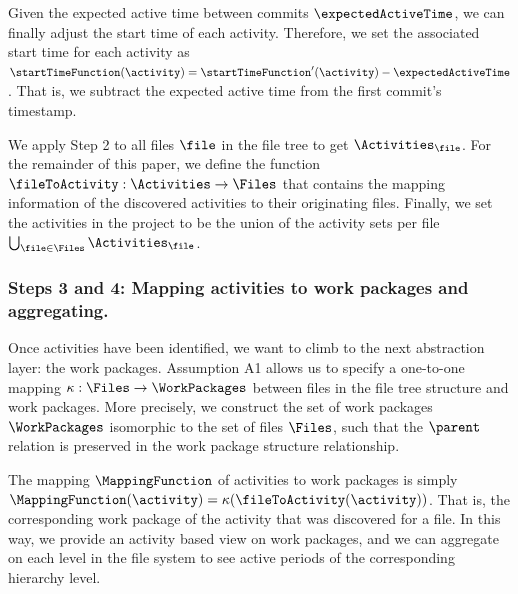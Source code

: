 Given the expected active time between commits $\expectedActiveTime$, we can finally adjust the start time of each activity. Therefore, we set the associated start time for each activity as $\startTimeFunction(\activity) = \startTimeFunction'(\activity) - \expectedActiveTime$. That is, we subtract the expected active time from the first commit's timestamp.

We apply Step 2 to all files $\file$ in the file tree to get $\Activities_\file$. For the remainder of this paper, we define the function $\fileToActivity : \Activities \rightarrow \Files$ that contains the mapping information of the discovered activities to their originating files. Finally, we set the activities \Activities in the project to be the union of the activity sets per file $\bigcup_{\file \in \Files} \Activities_\file$.

%


\subsubsection*{Steps 3 and 4: Mapping activities to work packages and aggregating.}
Once activities have been identified, we want to climb to the next abstraction layer: the work packages. Assumption A1 allows us to specify a one-to-one mapping $\kappa : \Files \rightarrow \WorkPackages$ between files in the file tree structure and work packages. More precisely, we construct the set of work packages $\WorkPackages$ isomorphic to the set of files $\Files$, such that the $\parent$ relation is preserved in the work package structure \Structure relationship. %

The mapping $\MappingFunction$ of activities to work packages is simply $\MappingFunction(\activity) = \kappa (\fileToActivity(\activity))$. That is, the corresponding work package of the activity that was discovered for a file.
In this way, we provide an activity based view on work packages, and we can aggregate on each level in the file system to see active periods of the corresponding hierarchy level.


